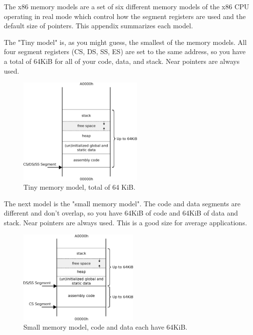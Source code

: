 \documentclass[book.tex]{subfiles}
\begin{document}
\label{appendix_memory_models}
The x86 memory models are a set of six different memory models of the x86 CPU operating in real mode which control how the segment registers are used and the default size of pointers. This appendix summarizes each model.\\

\par
The "Tiny model" is, as you might guess, the smallest of the memory models. All
four segment registers (CS, DS, SS, ES) are set to the same address, so you have a total of 64KiB for all of your code, data, and stack. Near pointers are always used. \\
\begin{figure}[H]
\centering
\includegraphics[width=0.55\textwidth]{imgs/drawings/memory/tiny_mm.eps}
\caption{Tiny memory model, total of 64 KiB.}
\label{fig:mm_tiny}
\end{figure}

\pagebreak

The next model is the "small memory model". The code and data segments are different and don't overlap, so you have 64KiB of code and 64KiB of data and stack. Near pointers are
always used. This is a good size for average applications.\\
\begin{figure}[H]
\centering
\includegraphics[width=0.53\textwidth]{imgs/drawings/memory/small_mm_v2.eps}
\caption{Small memory model, code and data each have 64KiB.}
\label{fig:mm_small}
\end{figure}
\end{document}
